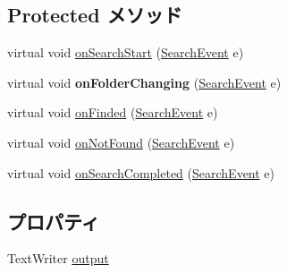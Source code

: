 \subsection*{Protected メソッド}
\begin{DoxyCompactItemize}
\item 
virtual void \hyperlink{classlazurite_1_1util_1_1searching_1_1_file_searcher_ex_abb1155f911891e4d899be670f42cffd9}{onSearchStart} (\hyperlink{classlazurite_1_1util_1_1searching_1_1_search_event}{SearchEvent} e)
\item 
\hypertarget{classlazurite_1_1util_1_1searching_1_1_file_searcher_ex_ac0e1b9e5b6652e5f3a603edf9a6526e7}{
virtual void {\bfseries onFolderChanging} (\hyperlink{classlazurite_1_1util_1_1searching_1_1_search_event}{SearchEvent} e)}
\label{classlazurite_1_1util_1_1searching_1_1_file_searcher_ex_ac0e1b9e5b6652e5f3a603edf9a6526e7}

\item 
virtual void \hyperlink{classlazurite_1_1util_1_1searching_1_1_file_searcher_ex_ab5fa27492288a1e1f772128c4a2af86c}{onFinded} (\hyperlink{classlazurite_1_1util_1_1searching_1_1_search_event}{SearchEvent} e)
\item 
virtual void \hyperlink{classlazurite_1_1util_1_1searching_1_1_file_searcher_ex_ad07092af0c702682e479c8894f00c0e3}{onNotFound} (\hyperlink{classlazurite_1_1util_1_1searching_1_1_search_event}{SearchEvent} e)
\item 
virtual void \hyperlink{classlazurite_1_1util_1_1searching_1_1_file_searcher_ex_a233744e0530f77a81f9bfed5e3b10b34}{onSearchCompleted} (\hyperlink{classlazurite_1_1util_1_1searching_1_1_search_event}{SearchEvent} e)
\end{DoxyCompactItemize}
\subsection*{プロパティ}
\begin{DoxyCompactItemize}
\item 
TextWriter \hyperlink{classlazurite_1_1util_1_1searching_1_1_file_searcher_ex_a49a377117740ac0734a57f1b13a44493}{output}
\end{DoxyCompactItemize}
